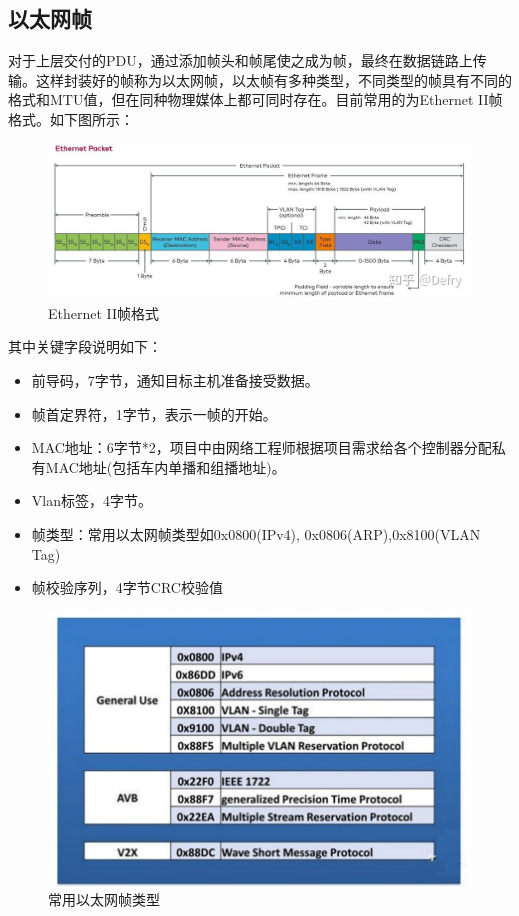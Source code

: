 \subsection{以太网帧}
对于上层交付的PDU，通过添加帧头和帧尾使之成为帧，最终在数据链路上传输。这样封装好的帧称为以太网帧，以太帧有多种类型，不同类型的帧具有不同的格式和MTU值，但在同种物理媒体上都可同时存在。目前常用的为Ethernet II帧格式。如下图所示：

\begin{figure}[ht]
    \centering
    \includegraphics[scale=0.6]{pic/eth_mac_format.jpg}
    \caption{Ethernet II帧格式}
    \label{fig:Ethernet_ii_frame}
\end{figure}

其中关键字段说明如下：
\begin{itemize}
    \item 前导码，7字节，通知目标主机准备接受数据。
    \item 帧首定界符，1字节，表示一帧的开始。
    \item MAC地址：6字节*2，项目中由网络工程师根据项目需求给各个控制器分配私有MAC地址(包括车内单播和组播地址)。
    \item Vlan标签，4字节。
    \item 帧类型：常用以太网帧类型如0x0800(IPv4), 0x0806(ARP),0x8100(VLAN Tag)
    \item 帧校验序列，4字节CRC校验值
\end{itemize}

\begin{figure}[ht]
    \centering
    \includegraphics[scale=1]{pic/Ethernet_frame_type.jpg}
    \caption{常用以太网帧类型}
    \label{fig:Ethernet_frame_type}
\end{figure}

